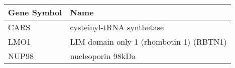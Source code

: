 \begin{tabular}{ll}
\toprule
Gene Symbol &                                    Name \\
\midrule
       CARS &               cysteinyl-tRNA synthetase \\
       LMO1 & LIM domain only 1 (rhombotin 1) (RBTN1) \\
      NUP98 &                       nucleoporin 98kDa \\
\bottomrule
\end{tabular}
